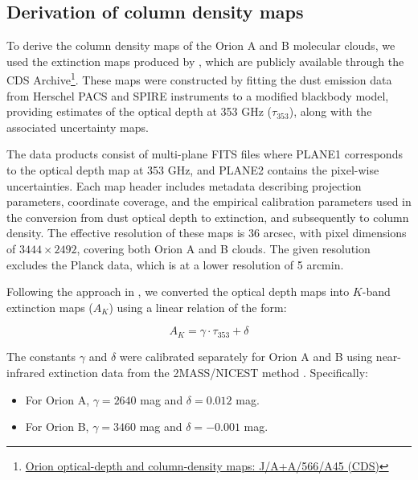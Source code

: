 
\subsection{Derivation of column density maps}

To derive the column density maps of the Orion A and B molecular clouds, we used the extinction maps produced by \cite{lombardi2014herschel}, which are publicly available through the CDS Archive\footnote{\href{https://cdsarc.cds.unistra.fr/viz-bin/cat/J/A+A/566/A45\#/browse}{Orion optical-depth and column-density maps: J/A+A/566/A45 (CDS)}}. 
These maps were constructed by fitting the dust emission data from Herschel PACS and SPIRE instruments to a modified blackbody model, providing estimates of the optical depth at 353 GHz ($\tau_{353}$), along with the associated uncertainty maps.

The data products consist of multi-plane FITS files where PLANE1 corresponds to the optical depth map at 353 GHz, and PLANE2 contains the pixel-wise uncertainties. Each map header includes metadata describing projection parameters, coordinate coverage, and the empirical calibration parameters used in the conversion from dust optical depth to extinction, and subsequently to column density. The effective resolution of these maps is 36 arcsec, with pixel dimensions of $3444 \times 2492$, covering both Orion A and B clouds. The given resolution excludes the Planck data, which is at a lower resolution of 5 arcmin.

Following the approach in \cite{lombardi2014herschel}, we converted the optical depth maps into $K$-band extinction maps ($A_K$) using a linear relation of the form:

\begin{equation}
    A_K = \gamma \cdot \tau_{353} + \delta
    \label{eq:ak_tau_relation}
\end{equation}

The constants $\gamma$ and $\delta$ were calibrated separately for Orion A and B using near-infrared extinction data from the 2MASS/NICEST method \cite{lombardi2009nicest}. Specifically:
\begin{itemize}
    \item For Orion A, $\gamma = 2640$ mag and $\delta = 0.012$ mag.
    \item For Orion B, $\gamma = 3460$ mag and $\delta = -0.001$ mag.
\end{itemize}

